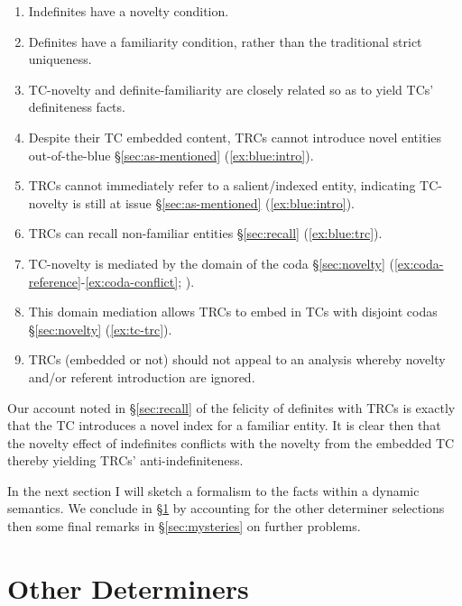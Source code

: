 \documentclass[11pt]{article}
\begin{document}
\begin{enumerate}[label=(\roman*)]
	\item Indefinites have a novelty condition.
	\item Definites have a familiarity condition, rather than the traditional strict uniqueness.
	\item TC-novelty and definite-familiarity are closely related so as to yield TCs' definiteness facts.
	\item Despite their TC embedded content, TRCs cannot introduce novel entities out-of-the-blue \S\ref{sec:as-mentioned} (\ref{ex:blue:intro}).
	\item TRCs cannot immediately refer to a salient/indexed entity, indicating TC-novelty is still at issue \S\ref{sec:as-mentioned} (\ref{ex:blue:intro}).
	\item TRCs can recall non-familiar entities \S\ref{sec:recall} (\ref{ex:blue:trc}).\label{sum:novel-recall}
	\item TC-novelty is mediated by the domain of the coda \S\ref{sec:novelty} (\ref{ex:coda-reference}-\ref{ex:coda-conflict}; \cite{zucchiIngredientsDefinitenessDefiniteness1995}).
	\item This domain mediation allows TRCs to embed in TCs with disjoint codas \S\ref{sec:novelty} (\ref{ex:tc-trc}).
	\item TRCs (embedded or not) should not appeal to an analysis whereby novelty and/or referent introduction are ignored.
\end{enumerate}

Our account noted in \S\ref{sec:recall} of the felicity of definites with TRCs is exactly that the TC introduces a novel index for a familiar entity. It is clear then that the novelty effect of indefinites conflicts with the novelty from the embedded TC thereby yielding TRCs' anti-indefiniteness.

In the next section I will sketch a formalism to the facts within a dynamic semantics. We conclude in \S\ref{sec:determiners} by accounting for the other determiner selections then some final remarks in \S\ref{sec:mysteries} on further problems.

\section{Other Determiners}\label{sec:determiners}
\end{document}
